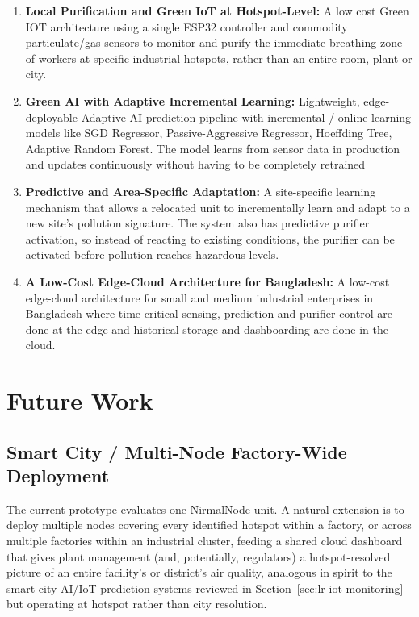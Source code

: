 \begin{enumerate}
   \item \textbf{ Local Purification and Green IoT at Hotspot-Level:}
    A low cost Green IOT architecture using a single ESP32 controller and commodity particulate/gas sensors to monitor and purify the immediate breathing zone of workers at specific industrial hotspots, rather than an entire room, plant or city.

    \item \textbf{Green AI with Adaptive Incremental Learning:}
    Lightweight, edge-deployable Adaptive AI prediction pipeline with incremental / online learning models like SGD Regressor, Passive-Aggressive Regressor, Hoeffding Tree, Adaptive Random Forest. The model learns from sensor data in production and updates continuously without having to be completely retrained

    \item \textbf{Predictive and Area-Specific Adaptation:}
    A site-specific learning mechanism that allows a relocated unit to incrementally learn and adapt to a new site’s pollution signature. The system also has predictive purifier activation, so instead of reacting to existing conditions, the purifier can be activated before pollution reaches hazardous levels.

    \item \textbf{A Low-Cost Edge-Cloud Architecture for Bangladesh:}
    A low-cost edge-cloud architecture for small and medium industrial enterprises in Bangladesh where time-critical sensing, prediction and purifier control are done at the edge and historical storage and dashboarding are done in the cloud.
\end{enumerate}

\section{Future Work}
\label{sec:conc-future-work}

\subsection{Smart City / Multi-Node Factory-Wide Deployment}
\label{sec:future-smartcity}
The current prototype evaluates one NirmalNode unit. A natural extension is to deploy multiple nodes covering every identified hotspot within a factory, or across multiple factories within an industrial cluster, feeding a shared cloud dashboard that gives plant management (and, potentially, regulators) a hotspot-resolved picture of an entire facility's or district's air quality, analogous in spirit to the smart-city AI/IoT prediction systems reviewed in Section~\ref{sec:lr-iot-monitoring} but operating at hotspot rather than city resolution.

